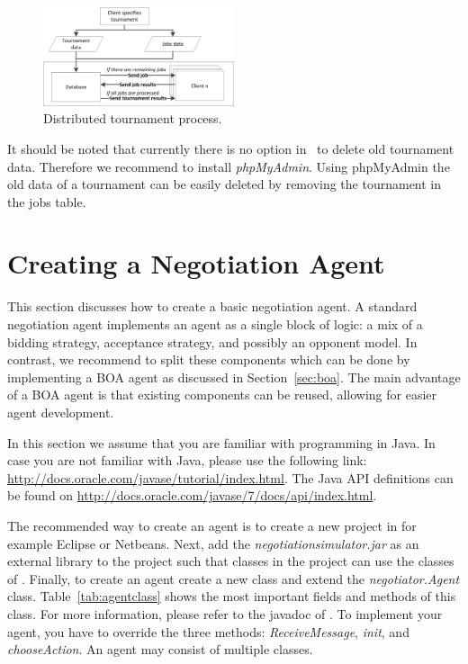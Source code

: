 \documentclass[]{article}
\begin{document}
\begin{figure}[htb]
	\centering
	\includegraphics[width=0.50\textwidth]{media/DistributedGenius.png}
\caption{Distributed tournament process.}\label{fig:dtournament}
\end{figure}

It should be noted that currently there is no option in \Genius~to delete old tournament data. Therefore we recommend to install \textit{phpMyAdmin}. Using phpMyAdmin the old data of a tournament can be easily deleted by removing the tournament in the jobs table.

\section{Creating a Negotiation Agent}
This section discusses how to create a basic negotiation agent. A standard negotiation agent implements an agent as a single block of logic: a mix of a bidding strategy, acceptance strategy, and possibly an opponent model. In contrast, we recommend to split these components which can be done by implementing a BOA agent as discussed in Section~\ref{sec:boa}. The main advantage of a BOA agent is that existing components can be reused, allowing for easier agent development.

In this section we assume that you are familiar with programming in Java. In case you are not familiar with Java, please use the following link: \url{http://docs.oracle.com/javase/tutorial/index.html}. The Java API definitions can be found on \url{http://docs.oracle.com/javase/7/docs/api/index.html}.

The recommended way to create an agent is to create a new project in for example Eclipse or Netbeans. Next, add the \textit{negotiationsimulator.jar} as an external library to the project such that classes in the project can use the classes of \Genius. Finally, to create an agent create a new class and extend the \textit{negotiator.Agent} class. Table~\ref{tab:agentclass} shows the most important fields and methods of this class. For more information, please refer to the javadoc of \Genius. To implement your agent, you have to override the three methods: \textit{ReceiveMessage}, \textit{init}, and \textit{chooseAction}. An agent may consist of multiple classes.
\end{document}
